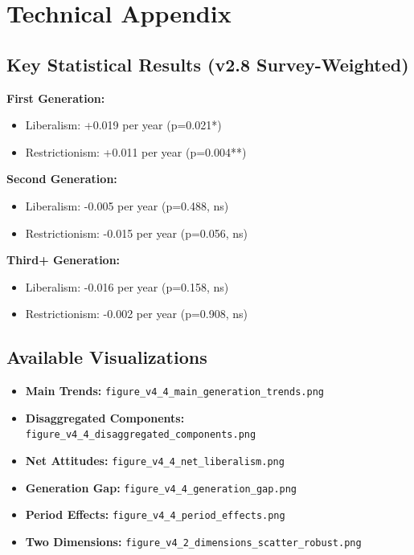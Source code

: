 \documentclass[11pt,letterpaper]{article}
\begin{document}
\section{Technical Appendix}

\subsection{Key Statistical Results (v2.8 Survey-Weighted)}

\textbf{First Generation:}
\begin{itemize}
    \item Liberalism: +0.019 per year (p=0.021*)
    \item Restrictionism: +0.011 per year (p=0.004**)
\end{itemize}

\textbf{Second Generation:}
\begin{itemize}
    \item Liberalism: -0.005 per year (p=0.488, ns)
    \item Restrictionism: -0.015 per year (p=0.056, ns)
\end{itemize}

\textbf{Third+ Generation:}
\begin{itemize}
    \item Liberalism: -0.016 per year (p=0.158, ns)
    \item Restrictionism: -0.002 per year (p=0.908, ns)
\end{itemize}

\subsection{Available Visualizations}
\begin{itemize}
    \item \textbf{Main Trends:} \texttt{figure\_v4\_4\_main\_generation\_trends.png}
    \item \textbf{Disaggregated Components:} \texttt{figure\_v4\_4\_disaggregated\_components.png}
    \item \textbf{Net Attitudes:} \texttt{figure\_v4\_4\_net\_liberalism.png}
    \item \textbf{Generation Gap:} \texttt{figure\_v4\_4\_generation\_gap.png}
    \item \textbf{Period Effects:} \texttt{figure\_v4\_4\_period\_effects.png}
    \item \textbf{Two Dimensions:} \texttt{figure\_v4\_2\_dimensions\_scatter\_robust.png}
\end{itemize}
\end{document}
